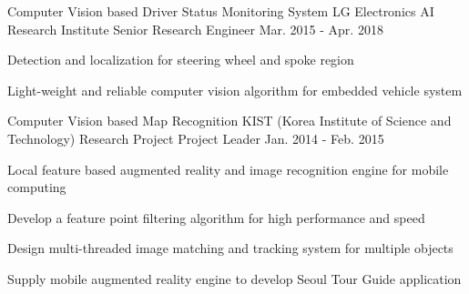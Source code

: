 


\begin{cventries}
  \cventry
    {Computer Vision based Driver Status Monitoring System} %
    {LG Electronics AI Research Institute} %
    {Senior Research Engineer} %
    {Mar. 2015 - Apr. 2018} %
    {
      \begin{cvitems} %
        \item {Detection and localization for steering wheel and spoke region}
        \item {Light-weight and reliable computer vision algorithm for embedded vehicle system}
      \end{cvitems}
    }

  \cventry
    {Computer Vision based Map Recognition} %
    {KIST (Korea Institute of Science and Technology) Research Project} %
    {Project Leader} %
    {Jan. 2014 - Feb. 2015} %
    {
      \begin{cvitems} %
        \item {Local feature based augmented reality and image recognition engine for mobile computing}
        \item {Develop a feature point filtering algorithm for high performance and speed}
        \item {Design multi-threaded image matching and tracking system for multiple objects}
        \item {Supply mobile augmented reality engine to develop Seoul Tour Guide application}
      \end{cvitems}
    }


\end{cventries}
